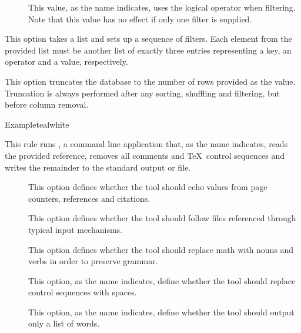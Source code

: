 \begin{description}
\begin{description}
\begin{description}
\item[] This value, as the name indicates, uses the logical  operator when filtering. Note that this value has no effect if only one filter is supplied.
\end{description}

\item[\abox{filters}] This option takes a list and sets up a sequence of filters. Each element from the provided list must be another list of exactly three entries representing a key, an operator and a value, respectively.

\item[\abox{truncate}] This option truncates the database to the number of rows provided as the value. Truncation is always performed after any sorting, shuffling and filtering, but before column removal.
\end{description}

\begin{codebox}{Example}{teal}{\icnote}{white}
\end{codebox}

\item[\rulebox{detex}]
This rule runs , a command line application that, as the name indicates, reads the provided  reference, removes all comments and \TeX\ control sequences and writes the remainder to the standard output or file.

\begin{description}
\item[] This option defines whether the tool should echo values from page counters, references and citations.

\item[] This option defines whether the tool should follow files referenced through typical input mechanisms.

\item[] This option defines whether the tool should replace math with nouns and verbs in order to preserve grammar.

\item[] This option, as the name indicates, define whether the tool should replace control sequences with spaces.

\item[] This option, as the name indicates, define whether the tool should output only a list of words.


\end{description}
\end{description}
